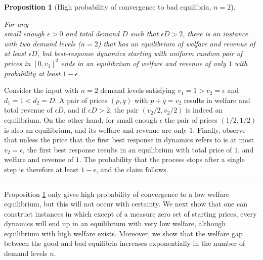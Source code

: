 \documentclass[11pt,a4paper]{article}
\newcommand{\qed}{\rule{1.5mm}{2mm}\vspace{0.1in}}
\newenvironment{proof}{\par\noindent{\bf Proof:}}{\qed}
\newtheorem{proposition}[theorem]{Proposition}
\begin{document}
\begin{proposition}[High probability of convergence to bad equilibria, $n=2$]
	\label{obs:conv-bad-NE-n is 2}

	For any\\   small enough $\epsilon>0$ and total demand $D$ such that $\epsilon D>2$,
	there is an instance with two demand levels ($n=2$) that has an equilibrium of welfare and revenue of at least $\epsilon D$, but best-response dynamics starting with uniform random pair of prices
in $[0,v_1]^2$ ends in an equilibrium of welfare and revenue of only $1$ with probability at least $1-\epsilon$.
\end{proposition}
\begin{proof}
	Consider the input with $n=2$ demand levels satisfying $v_1=1> v_2=\epsilon$ and $d_1=1<d_2=D$. %
	A pair of prices $(p,q)$ with $p+q=v_2$ results in welfare and total revenue of $\epsilon D$,
	and if $\epsilon D>2$, the pair $(v_2/2, v_2/2) $ is indeed an equilibrium.
	On the other hand, for small enough $\epsilon $ the pair of prices $(1/2,1/2)$ is also an equilibrium, and its welfare and revenue are only $1$. Finally, observe that unless the price that the first best response in dynamics refers to is at most $v_2=\epsilon$, the first best response results in an equilibrium with total price of $1$, and welfare and revenue of $1$. %
	The probability that the process stops after a single step is therefore at least
$1-\epsilon$, and the claim follows.
\end{proof}


Proposition \ref{obs:conv-bad-NE-n is 2} only gives high probability of convergence to a low welfare equilibrium, but this will not occur with certainty.
We next show that one can construct instances in which except of a measure zero %
set of starting prices, %
every dynamics will end up in an equilibrium with very low welfare, although equilibrium with high welfare exists.
Moreover, we show that the welfare gap between the good and bad equilibria increases exponentially in the number of demand levels $n$.
\end{document}
